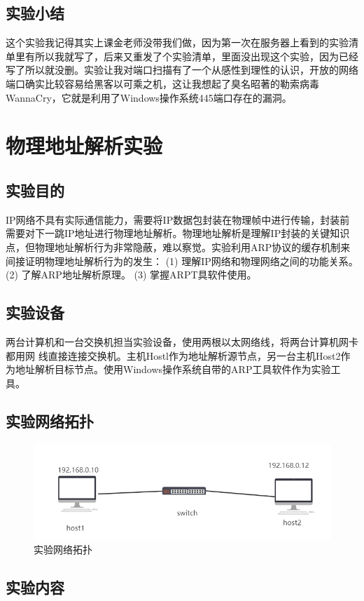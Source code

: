 \documentclass[lang=cn,11pt,a4paper,cite=authoryear]{elegantpaper}
\begin{document}
\subsection{实验小结}
这个实验我记得其实上课金老师没带我们做，因为第一次在服务器上看到的实验清单里有所以我就写了，后来又重发了个实验清单，里面没出现这个实验，因为已经写了所以就没删。实验让我对端口扫描有了一个从感性到理性的认识，开放的网络端口确实比较容易给黑客以可乘之机，这让我想起了臭名昭著的勒索病毒WannaCry，它就是利用了Windows操作系统445端口存在的漏洞。

\section{物理地址解析实验}
\subsection{实验目的}
IP网络不具有实际通信能力，需要将IP数据包封装在物理帧中进行传输，封装前需要对下一跳IP地址进行物理地址解析。物理地址解析是理解IP封装的关键知识点，但物理地址解析行为非常隐蔽，难以察觉。实验利用ARP协议的缓存机制来间接证明物理地址解析行为的发生：
(1)	理解IP网络和物理网络之间的功能关系。
(2)	了解ARP地址解析原理。
(3)	掌握ARPT具软件使用。

\subsection{实验设备}

两台计算机和一台交换机担当实验设备，使用两根以太网络线，将两台计算机网卡都用网 线直接连接交换机。主机Hostl作为地址解析源节点，另一台主机Host2作为地址解析目标节点。使用Windows操作系统自带的ARP工具软件作为实验工具。

\subsection{实验网络拓扑}
\begin{figure}[htbp]
	\centering
	\includegraphics[width=0.7\linewidth]{image/screenshot011}
	\caption{实验网络拓扑}
	\label{fig:screenshot011}
\end{figure}


\subsection{实验内容}
\end{document}
